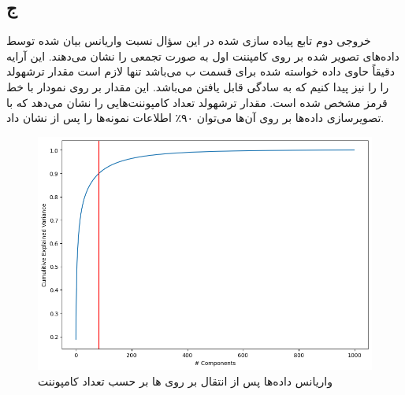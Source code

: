 \documentclass[12pt,onecolumn,a4paper]{article}
\begin{document}
\subsection*{ج}
خروجی دوم تابع پیاده سازی شده در این سؤال نسبت واریانس بیان شده توسط داده‌های تصویر شده بر روی  کامپننت اول به صورت تجمعی را نشان می‌دهند. این آرایه  دقیقاً حاوی داده خواسته شده برای قسمت ب می‌باشد تنها لازم است مقدار ترشهولد را را نیز پیدا کنیم که به سادگی قابل یافتن می‌باشد. این مقدار بر روی نمودار با خط قرمز مشخص شده است. مقدار ترشهولد تعداد کامپوننت‌هایی را نشان می‌دهد که با تصویرسازی داده‌ها بر روی آن‌ها می‌توان ۹۰٪ اطلاعات نمونه‌ها را پس از  نشان داد.
\begin{figure}[h!]
    \begin{center}
    \includegraphics[scale=0.55]{plots/q8_c.png}
    \caption{واریانس داده‌ها پس از انتقال بر روی ها بر حسب تعداد کامپوننت}
    \label{fig:5}
    \end{center}
\end{figure}
\end{document}
